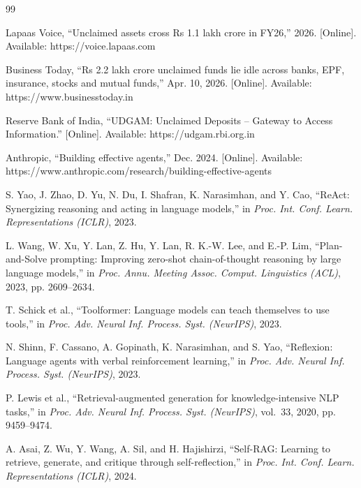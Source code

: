 \begin{thebibliography}{99}

 Lapaas Voice, ``Unclaimed assets cross Rs 1.1 lakh crore in FY26,'' 2026. [Online]. Available: https://voice.lapaas.com

 Business Today, ``Rs 2.2 lakh crore unclaimed funds lie idle across banks, EPF, insurance, stocks and mutual funds,'' Apr. 10, 2026. [Online]. Available: https://www.businesstoday.in

 Reserve Bank of India, ``UDGAM: Unclaimed Deposits -- Gateway to Access Information.'' [Online]. Available: https://udgam.rbi.org.in

 Anthropic, ``Building effective agents,'' Dec. 2024. [Online]. Available: https://www.anthropic.com/research/building-effective-agents

 S. Yao, J. Zhao, D. Yu, N. Du, I. Shafran, K. Narasimhan, and Y. Cao, ``ReAct: Synergizing reasoning and acting in language models,'' in \emph{Proc. Int. Conf. Learn. Representations (ICLR)}, 2023.

 L. Wang, W. Xu, Y. Lan, Z. Hu, Y. Lan, R. K.-W. Lee, and E.-P. Lim, ``Plan-and-Solve prompting: Improving zero-shot chain-of-thought reasoning by large language models,'' in \emph{Proc. Annu. Meeting Assoc. Comput. Linguistics (ACL)}, 2023, pp. 2609--2634.

 T. Schick et al., ``Toolformer: Language models can teach themselves to use tools,'' in \emph{Proc. Adv. Neural Inf. Process. Syst. (NeurIPS)}, 2023.

 N. Shinn, F. Cassano, A. Gopinath, K. Narasimhan, and S. Yao, ``Reflexion: Language agents with verbal reinforcement learning,'' in \emph{Proc. Adv. Neural Inf. Process. Syst. (NeurIPS)}, 2023.

 P. Lewis et al., ``Retrieval-augmented generation for knowledge-intensive NLP tasks,'' in \emph{Proc. Adv. Neural Inf. Process. Syst. (NeurIPS)}, vol.~33, 2020, pp. 9459--9474.

 A. Asai, Z. Wu, Y. Wang, A. Sil, and H. Hajishirzi, ``Self-RAG: Learning to retrieve, generate, and critique through self-reflection,'' in \emph{Proc. Int. Conf. Learn. Representations (ICLR)}, 2024.


\end{thebibliography}
